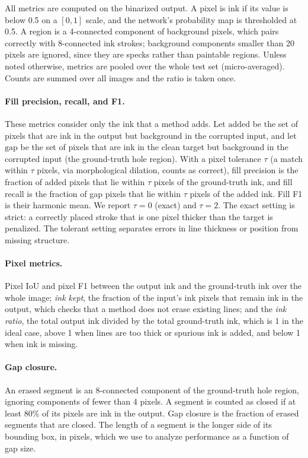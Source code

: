 \documentclass[pdflatex,sn-mathphys-num]{sn-jnl}%
\begin{document}
All metrics are computed on the binarized output. A pixel is ink if its value is
below 0.5 on a $[0,1]$ scale, and the network's probability map is thresholded at
0.5. A region is a 4-connected component of background pixels, which pairs correctly
with 8-connected ink strokes; background components smaller than 20 pixels are
ignored, since they are specks rather than paintable regions. Unless
noted otherwise, metrics are pooled over the whole test set (micro-averaged). Counts
are summed over all images and the ratio is taken once.

\paragraph{Fill precision, recall, and F1.} These metrics consider only the ink that
a method adds. Let $\text{added}$ be the set of pixels that are ink in the output but
background in the corrupted input, and let $\text{gap}$ be the set of pixels that are
ink in the clean target but background in the corrupted input (the ground-truth hole
region). With a pixel tolerance $\tau$ (a match within $\tau$ pixels, via
morphological dilation, counts as correct), fill precision is the fraction of added
pixels that lie within $\tau$ pixels of the ground-truth ink, and fill recall is the
fraction of gap pixels that lie within $\tau$ pixels of the added ink. Fill F1 is
their harmonic mean. We report $\tau = 0$ (exact) and $\tau = 2$. The exact setting
is strict: a correctly placed stroke that is one pixel thicker than the target is
penalized. The tolerant setting separates errors in line thickness or position from
missing structure.

\paragraph{Pixel metrics.} Pixel IoU and pixel F1 between the output ink and the
ground-truth ink over the whole image; \emph{ink kept}, the fraction of the input's
ink pixels that remain ink in the output, which checks that a method does not erase
existing lines; and the \emph{ink ratio}, the total output ink divided by the total
ground-truth ink, which is 1 in the ideal case, above 1 when lines are too thick or
spurious ink is added, and below 1 when ink is missing.

\paragraph{Gap closure.} An erased segment is an 8-connected component of the
ground-truth hole region, ignoring components of fewer than 4 pixels. A segment is
counted as closed if at least 80\% of its pixels are ink in the output. Gap closure is
the fraction of erased segments that are closed. The length of a segment is the
longer side of its bounding box, in pixels, which we use to analyze performance as a
function of gap size.
\end{document}
